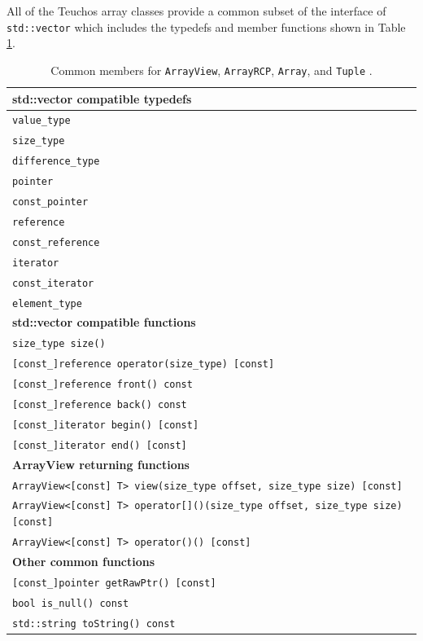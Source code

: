 \documentclass[pdf,ps2pdf,11pt]{SANDreport}
\begin{document}
All of the Teuchos array classes provide a common subset of the
interface of {}\texttt{std::vector} which includes the typedefs and
member functions shown in Table {}\ref{tbl:common-array-type-members}.

\begin{table}
{\small\begin{center}
\begin{tabular}{|l|}
\hline
{}\textbf{std::vector compatible typedefs} \\
\hline
{}\texttt{value\_type} \\
{}\texttt{size\_type} \\
{}\texttt{difference\_type} \\
{}\texttt{pointer} \\
{}\texttt{const\_pointer} \\
{}\texttt{reference} \\
{}\texttt{const\_reference} \\
{}\texttt{iterator} \\
{}\texttt{const\_iterator} \\
{}\texttt{element\_type} \\
\hline
{}\textbf{std::vector compatible functions} \\
\hline
{}\texttt{size\_type size()} \\
{}\texttt{[const\_]reference operator{}(size\_type) [const]} \\
{}\texttt{[const\_]reference front() const} \\
{}\texttt{[const\_]reference back() const} \\
{}\texttt{[const\_]iterator begin() [const]} \\
{}\texttt{[const\_]iterator end() [const]} \\
\hline
{}\textbf{ArrayView returning functions} \\
\hline
{}\texttt{ArrayView<[const] T> view(size\_type offset, size\_type size) [const]} \\
{}\texttt{ArrayView<[const] T> operator[]()(size\_type offset, size\_type size) [const]} \\
{}\texttt{ArrayView<[const] T> operator()() [const]} \\
\hline
{}\textbf{Other common functions} \\
\hline
{}\texttt{[const\_]pointer getRawPtr() [const]} \\
{}\texttt{bool is\_null() const} \\
{}\texttt{std::string toString() const} \\
\hline
\end{tabular}
\caption{\label{tbl:common-array-type-members} Common members for
{}\texttt{ArrayView}, {}\texttt{ArrayRCP}, {}\texttt{Array}, and
{}\texttt{Tuple} .}
\end{center}}
\end{table}
\end{document}

